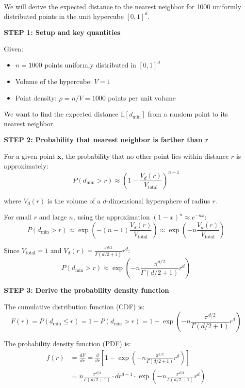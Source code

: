 \documentclass[12pt]{article}
\begin{document}
\begin{solution}
We will derive the expected distance to the nearest neighbor for 1000 uniformly distributed points in the unit hypercube \([0,1]^d\).

\textbf{STEP 1: Setup and key quantities}

Given:
\begin{itemize}
    \item \(n = 1000\) points uniformly distributed in \([0,1]^d\)
    \item Volume of the hypercube: \(V = 1\)
    \item Point density: \(\rho = n/V = 1000\) points per unit volume
\end{itemize}

We want to find the expected distance \(\mathbb{E}[d_{\min}]\) from a random point to its nearest neighbor.

\textbf{STEP 2: Probability that nearest neighbor is farther than r}

For a given point \(\mathbf{x}\), the probability that no other point lies within distance \(r\) is approximately:
\[
P(d_{\min} > r) \approx \left(1 - \frac{V_d(r)}{V_{\text{total}}}\right)^{n-1}
\]

where \(V_d(r)\) is the volume of a \(d\)-dimensional hypersphere of radius \(r\).

For small \(r\) and large \(n\), using the approximation \((1-x)^n \approx e^{-nx}\):
\[
P(d_{\min} > r) \approx \exp\left(-(n-1) \frac{V_d(r)}{V_{\text{total}}}\right) \approx \exp\left(-n \frac{V_d(r)}{V_{\text{total}}}\right)
\]

Since \(V_{\text{total}} = 1\) and \(V_d(r) = \frac{\pi^{d/2}}{\Gamma(d/2 + 1)} r^d\):
\[
P(d_{\min} > r) \approx \exp\left(-n \frac{\pi^{d/2}}{\Gamma(d/2 + 1)} r^d\right)
\]

\textbf{STEP 3: Derive the probability density function}

The cumulative distribution function (CDF) is:
\[
F(r) = P(d_{\min} \leq r) = 1 - P(d_{\min} > r) = 1 - \exp\left(-n \frac{\pi^{d/2}}{\Gamma(d/2 + 1)} r^d\right)
\]

The probability density function (PDF) is:
\begin{align*}
f(r) &= \frac{dF}{dr} = \frac{d}{dr}\left[1 - \exp\left(-n \frac{\pi^{d/2}}{\Gamma(d/2 + 1)} r^d\right)\right] \\
&= n \frac{\pi^{d/2}}{\Gamma(d/2 + 1)} \cdot d r^{d-1} \cdot \exp\left(-n \frac{\pi^{d/2}}{\Gamma(d/2 + 1)} r^d\right)
\end{align*}


\end{solution}
\end{document}
